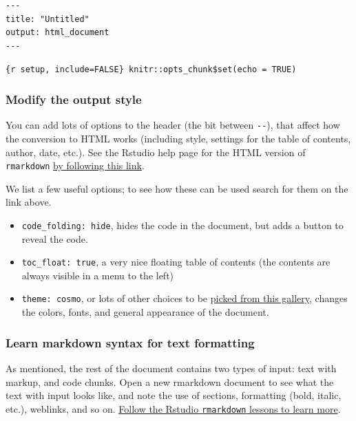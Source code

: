 \documentclass[]{book}
\providecommand{\tightlist}{%
  \setlength{\itemsep}{0pt}\setlength{\parskip}{0pt}}
\begin{document}
\begin{verbatim}
---
title: "Untitled"
output: html_document
---
\end{verbatim}

\texttt{\{r\ setup,\ include=FALSE\}\ knitr::opts\_chunk\$set(echo\ =\ TRUE)}

\hypertarget{modify-the-output-style}{%
\subsubsection*{Modify the output style}\label{modify-the-output-style}}

You can add lots of options to the header (the bit between \texttt{-\/-}), that affect how the conversion to HTML works (including style, settings for the table of contents, author, date, etc.). See the Rstudio help page for the HTML version of \texttt{rmarkdown} \href{https://bookdown.org/yihui/rmarkdown/html-document.html}{by following this link}.

We list a few useful options; to see how these can be used search for them on the link above.

\begin{itemize}
\tightlist
\item
  \texttt{code\_folding:\ hide}, hides the code in the document, but adds a button to reveal the code.
\item
  \texttt{toc\_float:\ true}, a very nice floating table of contents (the contents are always visible in a menu to the left)
\item
  \texttt{theme:\ cosmo}, or lots of other choices to be \href{https://bootswatch.com/3/}{picked from this gallery}, changes the colors, fonts, and general appearance of the document.
\end{itemize}

\hypertarget{learn-markdown-syntax-for-text-formatting}{%
\subsubsection*{Learn markdown syntax for text formatting}\label{learn-markdown-syntax-for-text-formatting}}

As mentioned, the rest of the document contains two types of input: text with markup, and code chunks. Open a new rmarkdown document to see what the text with input looks like, and note the use of sections, formatting (bold, italic, etc.), weblinks, and so on. \href{https://rmarkdown.rstudio.com/lesson-2.html}{Follow the Rstudio \texttt{rmarkdown} lessons to learn more}.
\end{document}
